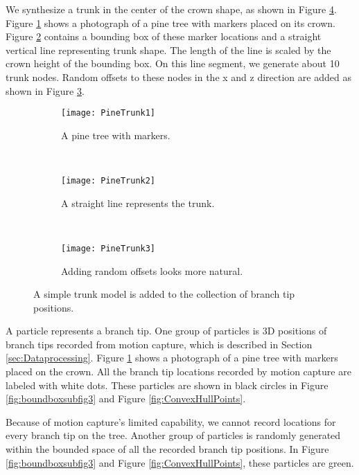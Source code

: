We synthesize a trunk in the center of the crown shape, as shown in Figure \ref{fig:PineTrunk}. Figure \ref{fig:PineTrunksubfig1} shows a photograph of a pine tree with markers placed on its crown. Figure \ref{fig:PineTrunksubfig2} contains a bounding box of these marker locations and a straight vertical line representing trunk shape. The length of the line is scaled by the crown height of the bounding box. On this line segment, we generate about 10 trunk nodes. Random offsets to these nodes in the x and z direction are added as shown in Figure \ref{fig:PineTrunksubfig3}.

\begin{figure}
\centering
        \begin{subfigure}[b]{0.22\textwidth}
                \centering
                \texttt{[image: PineTrunk1]}
                \caption{A pine tree with markers.}
                \label{fig:PineTrunksubfig1}
        \end{subfigure}
        ~
        \begin{subfigure}[b]{0.31\textwidth}
                \centering
                \texttt{[image: PineTrunk2]}
                \caption{A straight line represents the trunk.}
                \label{fig:PineTrunksubfig2}
        \end{subfigure} 
        ~
        \begin{subfigure}[b]{0.30\textwidth}
                \centering
                \texttt{[image: PineTrunk3]}
                \caption{Adding random offsets looks more natural.}
                \label{fig:PineTrunksubfig3}
        \end{subfigure}             
\caption{A simple trunk model is added to the collection of branch tip positions.}
\label{fig:PineTrunk}
\end{figure}

A particle represents a branch tip. One group of particles is 3D positions of branch tips recorded from motion capture, which is described in Section \ref{sec:Dataprocessing}. Figure \ref{fig:PineTrunksubfig1} shows a photograph of a pine tree with markers placed on the crown. All the branch tip locations recorded by motion capture are labeled with white dots. These particles are shown in black circles in Figure \ref{fig:boundboxsubfig3} and Figure \ref{fig:ConvexHullPoints}. 

Because of motion capture's limited capability, we cannot record locations for every branch tip on the tree. Another group of particles is randomly generated within the bounded space of all the recorded branch tip positions. In Figure \ref{fig:boundboxsubfig3} and Figure \ref{fig:ConvexHullPoints}, these particles are green. 


